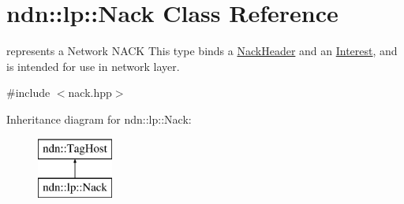 \hypertarget{classndn_1_1lp_1_1Nack}{}\section{ndn\+:\+:lp\+:\+:Nack Class Reference}
\label{classndn_1_1lp_1_1Nack}


represents a Network N\+A\+CK  This type binds a \hyperlink{classndn_1_1lp_1_1NackHeader}{Nack\+Header} and an \hyperlink{classndn_1_1Interest}{Interest}, and is intended for use in network layer.  




{\ttfamily \#include $<$nack.\+hpp$>$}

Inheritance diagram for ndn\+:\+:lp\+:\+:Nack\+:\begin{figure}[H]
\begin{center}
\leavevmode
\includegraphics[height=2.000000cm]{classndn_1_1lp_1_1Nack}
\end{center}
\end{figure}
